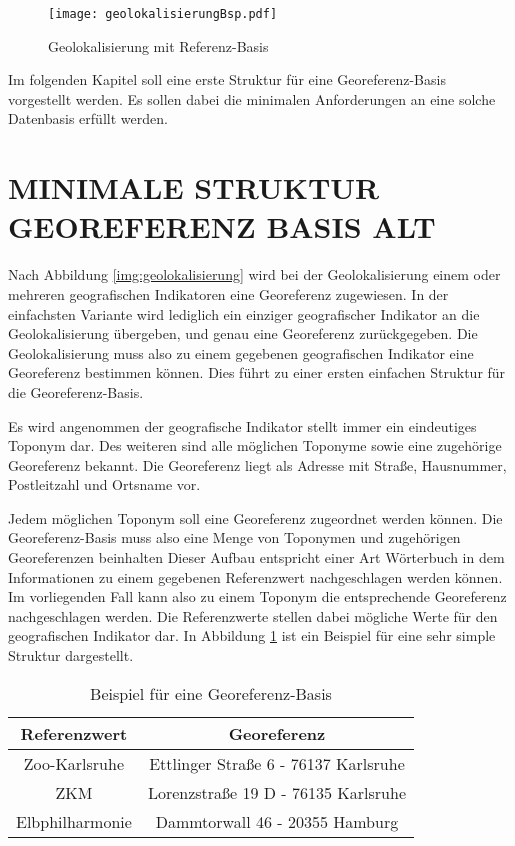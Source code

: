 		\begin{figure}[!ht]
		\begin{center}
		\texttt{[image: geolokalisierungBsp.pdf]}
		\caption{Geolokalisierung mit Referenz-Basis}
		\label{img:geolokalisierungBsp}
		\end{center}
		\end{figure}	

		Im folgenden Kapitel soll eine erste Struktur für eine Georeferenz-Basis vorgestellt werden.
		Es sollen dabei die minimalen Anforderungen an eine solche Datenbasis erfüllt werden.

	\section{MINIMALE STRUKTUR GEOREFERENZ BASIS ALT} \label{sec:generelleStruktur} 
		

		Nach Abbildung \ref{img:geolokalisierung} wird bei der Geolokalisierung einem oder mehreren geografischen Indikatoren eine Georeferenz zugewiesen.
		In der einfachsten Variante wird lediglich ein einziger geografischer Indikator an die Geolokalisierung übergeben, und genau eine Georeferenz zurückgegeben.
		Die Geolokalisierung muss also zu einem gegebenen geografischen Indikator eine Georeferenz bestimmen können.
		Dies führt zu einer ersten einfachen Struktur für die Georeferenz-Basis.	

		Es wird angenommen der geografische Indikator stellt immer ein eindeutiges Toponym dar.
		Des weiteren sind alle möglichen Toponyme sowie eine zugehörige Georeferenz bekannt. 
		Die Georeferenz liegt als Adresse mit Straße, Hausnummer, Postleitzahl und Ortsname vor.

		Jedem möglichen Toponym soll eine Georeferenz zugeordnet werden können. 
		Die Georeferenz-Basis muss also eine Menge von Toponymen und zugehörigen Georeferenzen beinhalten
		Dieser Aufbau entspricht einer Art Wörterbuch in dem Informationen zu einem gegebenen Referenzwert nachgeschlagen werden können.
		Im vorliegenden Fall kann also zu einem Toponym die entsprechende Georeferenz nachgeschlagen werden.
		Die Referenzwerte stellen dabei mögliche Werte für den geografischen Indikator dar. 
		In Abbildung \ref{tab:simpleStruktur} ist ein Beispiel für eine sehr simple Struktur dargestellt.

		\begin{table}[htpb]
				\caption{Beispiel für eine Georeferenz-Basis} 
				\centering
				\begin{tabular}{|c||c|}
					\hline
					Referenzwert & Georeferenz \\
					\hline\hline
					Zoo-Karlsruhe & Ettlinger Straße 6 - 76137 Karlsruhe \\
					\hline
					ZKM & Lorenzstraße 19 D - 76135 Karlsruhe \\
					\hline
					Elbphilharmonie & Dammtorwall 46 - 20355 Hamburg \\
					\hline
				\end{tabular}
				\label{tab:simpleStruktur} 
		\end{table} 

